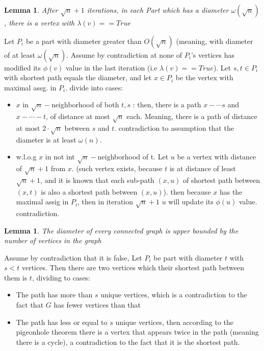 \documentclass[11pt]{article}
\newtheorem{lemma}[theorem]{Lemma}
\begin{document}
\begin{lemma}
\label{discovery_large_diameter_parts}
After $\sqrt{n} + 1$ iterations, in each Part which has a diameter $\omega(\sqrt{n})$, there is a vertex with $\lambda(v) == True$
\end{lemma}
Let $P_i$ be a part with diameter greater than $O(\sqrt{n})$ (meaning, with diameter of at least $\omega(\sqrt{n})$. Assume by contradiction at none of $P_i$'s vertices has modified its $\phi(v)$ value in the last iteration (i.e $\lambda(v) == True$). Let $s,t \in P_i$ with shortest path equals the diameter, and let $x \in P_i$ be the vertex with maximal assg. in $P_i$. divide into cases:
\begin{itemize}
    \item $x$ in $\sqrt{n}-$neighborhood of both $t,s$ : then, there is a path $x - \cdots s$ and $x - \cdots - t$, of distance at most $\sqrt{n}$ each. Meaning, there is a path of distance at most $2 \cdot \sqrt{n}$ between $s$ and $t$. contradiction to assumption that the diameter is at least $\omega(n)$.
    \item w.l.o.g $x$ in not int $\sqrt{n}-$neighborhood of t. Let $u$ be a vertex with distance of $\sqrt{n} +1 $ from $x$. (such vertex exists, because $t$ is at distance of least $\sqrt{n} +1 $, and it is known that each sub-path $(x,u)$ of shortest path between $(x,t)$ is also a shortest path between $(x,u)$). then because $x$ has the maximal assig in $P_i$, then in iteration $\sqrt{n} +1 $ $u$ will update its $\phi(u)$ value. contradiction.
\end{itemize}

\begin{lemma}
\label{dimater_upper_bound_amount_vertices}
The diameter of every connected graph is upper bounded by the number of vertices in the graph
\end{lemma}
 Assume by contradiction that it is false, Let $P_i$ be part with diameter $t$ with $s < t$ vertices. Then there are two vertices which their shortest path between them is $t$, dividing to cases:
\begin{itemize}
    \item The path has more than $s$ unique vertices, which is a contradiction to the fact that $G$ has fewer vertices than that
    \item The path has less or equal to $s$ unique vertices, then according to the pigeonhole theorem there is a vertex that appears twice in the path (meaning there is a cycle), a contradiction to the fact that it is the shortest path. 
\end{itemize}
\end{document}
